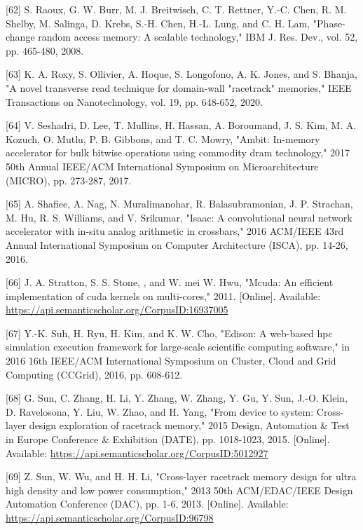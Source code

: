 \documentclass[10pt]{article}
\begin{document}
[62] S. Raoux, G. W. Burr, M. J. Breitwisch, C. T. Rettner, Y.-C. Chen, R. M. Shelby, M. Salinga, D. Krebs, S.-H. Chen, H.-L. Lung, and C. H. Lam, "Phase-change random access memory: A scalable technology," IBM J. Res. Dev., vol. 52, pp. 465-480, 2008.

[63] K. A. Roxy, S. Ollivier, A. Hoque, S. Longofono, A. K. Jones, and S. Bhanja, "A novel transverse read technique for domain-wall "racetrack" memories," IEEE Transactions on Nanotechnology, vol. 19, pp. 648-652, 2020.

[64] V. Seshadri, D. Lee, T. Mullins, H. Hassan, A. Boroumand, J. S. Kim, M. A. Kozuch, O. Mutlu, P. B. Gibbons, and T. C. Mowry, "Ambit: In-memory accelerator for bulk bitwise operations using commodity dram technology," 2017 50th Annual IEEE/ACM International Symposium on Microarchitecture (MICRO), pp. 273-287, 2017.

[65] A. Shafiee, A. Nag, N. Muralimanohar, R. Balasubramonian, J. P. Strachan, M. Hu, R. S. Williams, and V. Srikumar, "Isaac: A convolutional neural network accelerator with in-situ analog arithmetic in crossbars," 2016 ACM/IEEE 43rd Annual International Symposium on Computer Architecture (ISCA), pp. 14-26, 2016.

[66] J. A. Stratton, S. S. Stone, , and W. mei W. Hwu, "Mcuda: An efficient implementation of cuda kernels on multi-cores," 2011. [Online]. Available: \href{https://api.semanticscholar.org/CorpusID:16937005}{https://api.semanticscholar.org/CorpusID:16937005}

[67] Y.-K. Suh, H. Ryu, H. Kim, and K. W. Cho, "Edison: A web-based hpc simulation execution framework for large-scale scientific computing software," in 2016 16th IEEE/ACM International Symposium on Cluster, Cloud and Grid Computing (CCGrid), 2016, pp. 608-612.

[68] G. Sun, C. Zhang, H. Li, Y. Zhang, W. Zhang, Y. Gu, Y. Sun, J.-O. Klein, D. Ravelosona, Y. Liu, W. Zhao, and H. Yang, "From device to system: Cross-layer design exploration of racetrack memory," 2015 Design, Automation \& Test in Europe Conference \& Exhibition (DATE), pp. 1018-1023, 2015. [Online]. Available: \href{https://api.semanticscholar.org/CorpusID:5012927}{https://api.semanticscholar.org/CorpusID:5012927}

[69] Z. Sun, W. Wu, and H. H. Li, "Cross-layer racetrack memory design for ultra high density and low power consumption," 2013 50th ACM/EDAC/IEEE Design Automation Conference (DAC), pp. 1-6, 2013. [Online]. Available: \href{https://api.semanticscholar.org/CorpusID:96798}{https://api.semanticscholar.org/CorpusID:96798}
\end{document}
